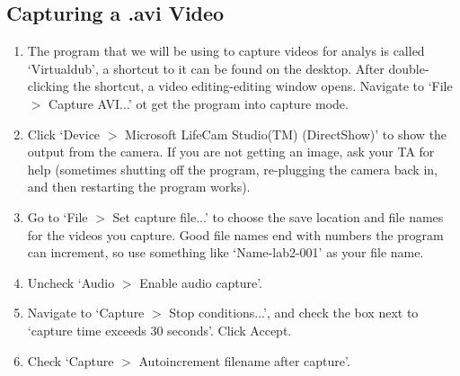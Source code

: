 \subsection{Capturing a .avi Video}
\begin{enumerate}
\item The program that we will be using to capture videos for analys is called `Virtualdub', a shortcut to it can be found on the desktop. After double-clicking the shortcut, a video editing-editing window opens. Navigate to `File $>$ Capture AVI...' ot get the program into capture mode.
\item Click `Device $>$ Microsoft LifeCam Studio(TM) (DirectShow)' to show the output from the camera. If you are not getting an image, ask your TA for help (sometimes shutting off the program, re-plugging the camera back in, and then restarting the program works).
\item Go to `File $>$ Set capture file...' to choose the save location and file names for the videos you capture. Good file names end with numbers the program can increment, so use something like `Name-lab2-001' as your file name.
\item Uncheck `Audio $>$ Enable audio capture'.
\item Navigate to `Capture $>$ Stop conditions...', and check the box next to `capture time exceeds 30 seconds'. Click Accept.
\item Check `Capture $>$ Autoincrement filename after capture'.
\end{enumerate}


